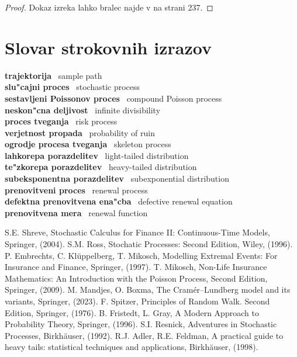 \documentclass[12pt, a4paper, reqno]{amsart}
\theoremstyle{definition}
\theoremstyle{plain}
\newcommand{\1}{\mathds{1}}
\begin{document}
    \begin{proof}
        Dokaz izreka lahko bralec najde v \cite{8} na strani 237. 
    \end{proof}


\pagebreak
\section*{Slovar strokovnih izrazov}

\noindent
\textbf{trajektorija} \ sample path \\
\textbf{slu"cajni proces} \ stochastic process \\
\textbf{sestavljeni Poissonov proces} \ compound Poisson process \\
\textbf{neskon"cna deljivost} \ infinite divisibility \\
\textbf{proces tveganja} \ risk process \\
\textbf{verjetnost propada} \ probability of ruin \\
\textbf{ogrodje procesa tveganja} \ skeleton process \\
\textbf{lahkorepa porazdelitev} \ light-tailed distribution \\
\textbf{te"zkorepa porazdelitev} \ heavy-tailed distribution \\
\textbf{subeksponentna porazdelitev} \ subexponential distribution \\
\textbf{prenovitveni proces} \ renewal process \\
\textbf{defektna prenovitvena ena"cba} \ defective renewal equation \\
\textbf{prenovitvena mera} \ renewal function \\

\begin{thebibliography}{99}
S.E. Shreve, Stochastic Calculus for Finance II: Continuous-Time Models, Springer, (2004).
S.M. Ross, Stochatic Processes: Second Edition, Wiley, (1996).
P. Embrechts, C. Klüppelberg, T. Mikosch, Modelling Extremal Events: For Insurance and Finance, Springer, (1997).
T. Mikosch, Non-Life Insurance Mathematics: An Introduction with the Poisson Process, Second Edition, Springer, (2009).
M. Mandjes, O. Boxma, The Cramér--Lundberg model and its variants, Springer, (2023).
F. Spitzer, Principles of Random Walk. Second Edition, Springer, (1976).
B. Fristedt, L. Gray, A Modern Approach to Probability Theory, Springer, (1996).
S.I. Resnick, Adventures in Stochastic Processes, Birkhäuser, (1992).
R.J. Adler, R.E. Feldman, A practical guide to heavy tails: statistical techniques and applications, Birkhäuser, (1998).
\end{thebibliography}
\end{document}
